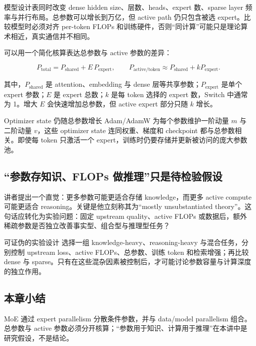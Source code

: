 模型设计表同时改变 dense hidden size、层数、heads、expert 数、sparse layer 频率与并行布局。总参数可以增长到万亿，但 active path 仍只包含被选 expert。比较模型时必须对齐 per-token FLOPs 和训练硬件，否则“同计算”可能只是理论算术相近，真实通信并不相同。


可以用一个简化核算表达总参数与 active 参数的差异：

\[
P_{\text{total}}=P_{\text{shared}}+E\,P_{\text{expert}},
\qquad
P_{\text{active/token}}\approx P_{\text{shared}}+kP_{\text{expert}}.
\]

其中，$P_{\text{shared}}$ 是 attention、embedding 与 dense 层等共享参数；$P_{\text{expert}}$ 是单个 expert 参数；$E$ 是 expert 总数；$k$ 是每 token 选择的 expert 数，Switch 中通常为 1。增大 $E$ 会快速增加总参数，但 active expert 部分只随 $k$ 增长。

\begin{warningbox}{Optimizer state 仍随总参数增长}
Adam/AdamW 为每个参数维护一阶动量 $m$ 与二阶动量 $v$，这些 optimizer state 连同权重、梯度和 checkpoint 都与总参数相关。即使每 token 只激活一个 expert，训练时仍要存储并更新被访问的庞大参数池。
\end{warningbox}

\subsection{“参数存知识、FLOPs 做推理”只是待检验假设}

讲者提出一个直觉：更多参数可能更适合存储 knowledge，而更多 active compute 可能更适合 reasoning。关键是他立刻称其为“mostly unsubstantiated theory”。这句话应转化为实验问题：固定 upstream quality、active FLOPs 或数据后，额外稀疏参数是否独立改善事实型、组合型与推理型任务？



\begin{importantbox}{可证伪的实验设计}
选择一组 knowledge-heavy、reasoning-heavy 与混合任务，分别控制 upstream loss、active FLOPs、总参数、训练 token 和检索增强；再比较 dense 与 sparse。只有在这些混杂因素被控制后，才可能讨论参数容量与计算深度的独立作用。
\end{importantbox}

\subsection{本章小结}

MoE 通过 expert parallelism 分散条件参数，并与 data/model parallelism 组合。总参数与 active 参数必须分开核算；“参数用于知识、计算用于推理”在本讲中是研究假设，不是结论。

